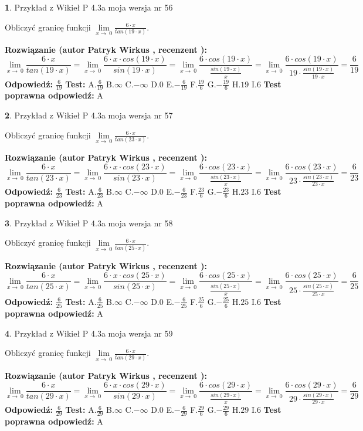 \documentclass[12pt, a4paper]{article}
\theoremstyle{definition} %
\newtheorem{zad}{}
\newcommand{\zadStart}[1]{\begin{zad}#1\newline}
\newcommand{\zadStop}{\end{zad}}
\newcommand{\rozwStart}[2]{\noindent \textbf{Rozwiązanie (autor #1 , recenzent #2): }\newline}
\newcommand{\rozwStop}{\newline}
\newcommand{\odpStart}{\noindent \textbf{Odpowiedź:}\newline}
\newcommand{\odpStop}{\newline}
\newcommand{\testStart}{\noindent \textbf{Test:}\newline}
\newcommand{\testStop}{\newline}
\newcommand{\kluczStart}{\noindent \textbf{Test poprawna odpowiedź:}\newline}
\newcommand{\kluczStop}{\newline}
\begin{document}
\zadStart{Przykład z Wikieł P 4.3a moja wersja nr 56}


Obliczyć granicę funkcji $\lim\limits_{x\to\ 0}\frac{6 \cdot x}{tan(19 \cdot x)}$.
\zadStop
\rozwStart{Patryk Wirkus}{}
$$\lim\limits_{x\to\ 0}\frac{6 \cdot x}{tan(19 \cdot x)}=\lim\limits_{x\to\ 0}\frac{6 \cdot x \cdot cos(19 \cdot x)}{sin(19 \cdot x)}=\lim\limits_{x\to\ 0}\frac{6 \cdot cos(19 \cdot x)}{\frac{sin(19 \cdot x)}{x}}=\lim\limits_{x\to\ 0}\frac{6 \cdot cos(19 \cdot x)}{19 \cdot \frac{sin(19 \cdot x)}{19 \cdot x}} = \frac{6}{19}$$
\rozwStop
\odpStart
$\frac{6}{19}$
\odpStop
\testStart
A.$\frac{6}{19}$
B.$\infty$
C.$-\infty$
D.$0$
E.$-\frac{6}{19}$
F.$\frac{19}{6}$
G.$-\frac{19}{6}$
H.$19$
I.$6$
\testStop
\kluczStart
A
\kluczStop



\zadStart{Przykład z Wikieł P 4.3a moja wersja nr 57}


Obliczyć granicę funkcji $\lim\limits_{x\to\ 0}\frac{6 \cdot x}{tan(23 \cdot x)}$.
\zadStop
\rozwStart{Patryk Wirkus}{}
$$\lim\limits_{x\to\ 0}\frac{6 \cdot x}{tan(23 \cdot x)}=\lim\limits_{x\to\ 0}\frac{6 \cdot x \cdot cos(23 \cdot x)}{sin(23 \cdot x)}=\lim\limits_{x\to\ 0}\frac{6 \cdot cos(23 \cdot x)}{\frac{sin(23 \cdot x)}{x}}=\lim\limits_{x\to\ 0}\frac{6 \cdot cos(23 \cdot x)}{23 \cdot \frac{sin(23 \cdot x)}{23 \cdot x}} = \frac{6}{23}$$
\rozwStop
\odpStart
$\frac{6}{23}$
\odpStop
\testStart
A.$\frac{6}{23}$
B.$\infty$
C.$-\infty$
D.$0$
E.$-\frac{6}{23}$
F.$\frac{23}{6}$
G.$-\frac{23}{6}$
H.$23$
I.$6$
\testStop
\kluczStart
A
\kluczStop



\zadStart{Przykład z Wikieł P 4.3a moja wersja nr 58}


Obliczyć granicę funkcji $\lim\limits_{x\to\ 0}\frac{6 \cdot x}{tan(25 \cdot x)}$.
\zadStop
\rozwStart{Patryk Wirkus}{}
$$\lim\limits_{x\to\ 0}\frac{6 \cdot x}{tan(25 \cdot x)}=\lim\limits_{x\to\ 0}\frac{6 \cdot x \cdot cos(25 \cdot x)}{sin(25 \cdot x)}=\lim\limits_{x\to\ 0}\frac{6 \cdot cos(25 \cdot x)}{\frac{sin(25 \cdot x)}{x}}=\lim\limits_{x\to\ 0}\frac{6 \cdot cos(25 \cdot x)}{25 \cdot \frac{sin(25 \cdot x)}{25 \cdot x}} = \frac{6}{25}$$
\rozwStop
\odpStart
$\frac{6}{25}$
\odpStop
\testStart
A.$\frac{6}{25}$
B.$\infty$
C.$-\infty$
D.$0$
E.$-\frac{6}{25}$
F.$\frac{25}{6}$
G.$-\frac{25}{6}$
H.$25$
I.$6$
\testStop
\kluczStart
A
\kluczStop



\zadStart{Przykład z Wikieł P 4.3a moja wersja nr 59}


Obliczyć granicę funkcji $\lim\limits_{x\to\ 0}\frac{6 \cdot x}{tan(29 \cdot x)}$.
\zadStop
\rozwStart{Patryk Wirkus}{}
$$\lim\limits_{x\to\ 0}\frac{6 \cdot x}{tan(29 \cdot x)}=\lim\limits_{x\to\ 0}\frac{6 \cdot x \cdot cos(29 \cdot x)}{sin(29 \cdot x)}=\lim\limits_{x\to\ 0}\frac{6 \cdot cos(29 \cdot x)}{\frac{sin(29 \cdot x)}{x}}=\lim\limits_{x\to\ 0}\frac{6 \cdot cos(29 \cdot x)}{29 \cdot \frac{sin(29 \cdot x)}{29 \cdot x}} = \frac{6}{29}$$
\rozwStop
\odpStart
$\frac{6}{29}$
\odpStop
\testStart
A.$\frac{6}{29}$
B.$\infty$
C.$-\infty$
D.$0$
E.$-\frac{6}{29}$
F.$\frac{29}{6}$
G.$-\frac{29}{6}$
H.$29$
I.$6$
\testStop
\kluczStart
A
\kluczStop
\end{document}
